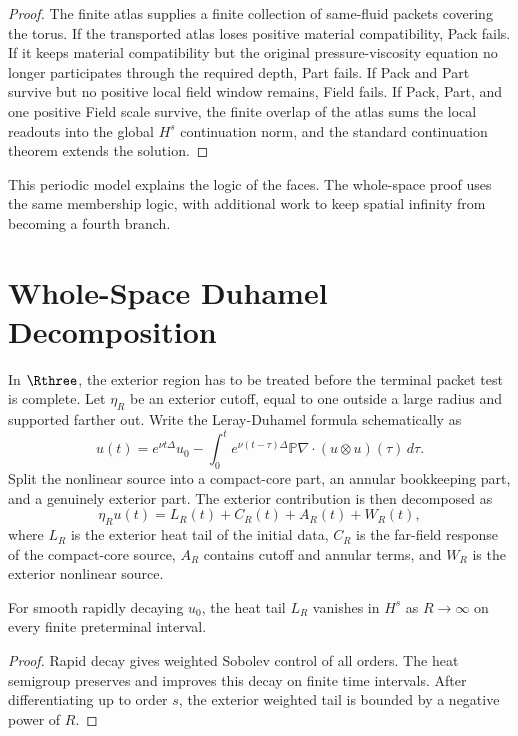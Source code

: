 \begin{proof}
The finite atlas supplies a finite collection of same-fluid packets covering the torus.
If the transported atlas loses positive material compatibility, Pack fails.
If it keeps material compatibility but the original pressure-viscosity equation no longer participates through the required depth, Part fails.
If Pack and Part survive but no positive local field window remains, Field fails.
If Pack, Part, and one positive Field scale survive, the finite overlap of the atlas sums the local readouts into the global \(H^s\) continuation norm, and the standard continuation theorem extends the solution.
\end{proof}

This periodic model explains the logic of the faces.
The whole-space proof uses the same membership logic, with additional work to keep spatial infinity from becoming a fourth branch.

\section{Whole-Space Duhamel Decomposition}

In \(\Rthree\), the exterior region has to be treated before the terminal packet test is complete.
Let \(\eta_R\) be an exterior cutoff, equal to one outside a large radius and supported farther out.
Write the Leray-Duhamel formula schematically as
\[
u(t)=e^{\nu t\Delta}u_0
-\int_0^t e^{\nu(t-\tau)\Delta}\mathbb P\nabla\cdot(u\otimes u)(\tau)\,d\tau.
\]
Split the nonlinear source into a compact-core part, an annular bookkeeping part, and a genuinely exterior part.
The exterior contribution is then decomposed as
\[
  \eta_R u(t)=L_R(t)+C_R(t)+A_R(t)+W_R(t),
\]
where \(L_R\) is the exterior heat tail of the initial data, \(C_R\) is the far-field response of the compact-core source, \(A_R\) contains cutoff and annular terms, and \(W_R\) is the exterior nonlinear source.

\begin{lemma}
For smooth rapidly decaying \(u_0\), the heat tail \(L_R\) vanishes in \(H^s\) as \(R\to\infty\) on every finite preterminal interval.
\end{lemma}

\begin{proof}
Rapid decay gives weighted Sobolev control of all orders.
The heat semigroup preserves and improves this decay on finite time intervals.
After differentiating up to order \(s\), the exterior weighted tail is bounded by a negative power of \(R\).
\end{proof}


